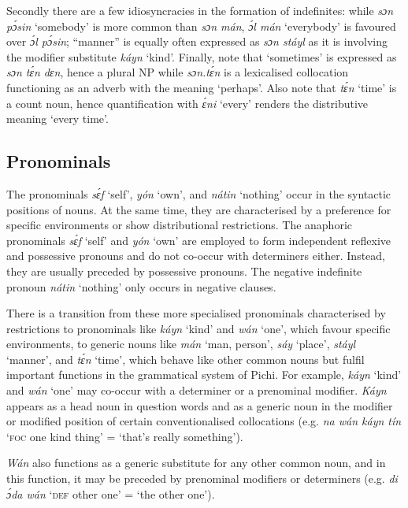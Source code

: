 Secondly there are a few idiosyncracies in the formation of indefinites: while \textit{sɔn pɔ́sin} ‘somebody’ is more common than \textit{sɔn mán}, \textit{ɔ́l mán} ‘everybody’ is favoured over \textit{ɔ́l pɔ́sin}; “manner” is equally often expressed as \textit{sɔn stáyl} as it is involving the modifier substitute \textit{káyn} ‘kind’. Finally, note that ‘sometimes’ is expressed as \textit{sɔn tɛ́n dɛn}, hence a plural NP while \textit{sɔn.tɛ́n} is a lexicalised collocation functioning as an adverb with the meaning ‘perhaps’. Also note that \textit{tɛ́n} ‘time’ is a count noun, hence quantification with \textit{ɛ́ni} ‘every’ renders the distributive meaning ‘every time’. 


\subsection{Pronominals}\label{sec:5.4.4}

The pronominals \textit{sɛ́f} ‘self’, \textit{yón} ‘own’, {\fff}and \textit{nátin} ‘nothing’ occur in the syntactic positions of nouns. At the same time, they are characterised by a preference for specific environments or show distributional restrictions. The anaphoric pronominals \textit{sɛ́f} ‘self’ and \textit{yón} ‘own’ are employed to form independent reflexive{\fff} and possessive pronouns and do not co-occur with determiners either. Instead, they are usually preceded by possessive pronouns. The negative indefinite pronoun \textit{nátin} ‘nothing’ only occurs in negative clauses. 


There is a transition from these more specialised pronominals characterised by restrictions to pronominals like \textit{káyn} ‘kind’ and \textit{wán} ‘one’, which favour specific environments, to generic nouns like \textit{mán} ‘man, person’, \textit{sáy} ‘place’, \textit{stáyl} ‘manner’, and \textit{tɛ́n} ‘time’, which behave like other common nouns but fulfil important functions in the grammatical system of Pichi. For example, \textit{káyn} ‘kind’ and \textit{wán} ‘one’ may co-occur with a determiner or a prenominal modifier. \textit{Káyn} appears as a head noun in question words and as a generic noun{\fff} in the modifier or modified position of certain conventionalised collocations (e.g. \textit{na wán káyn tín} ‘\textsc{foc} one kind thing’ = ‘that’s really something’). 



\textit{Wán} also functions as a generic substitute for any other common noun, and in this function, it may be preceded by prenominal modifiers or determiners (e.g. \textit{di ɔ́da wán} ‘\textsc{def} other one’ = ‘the other one’). 


